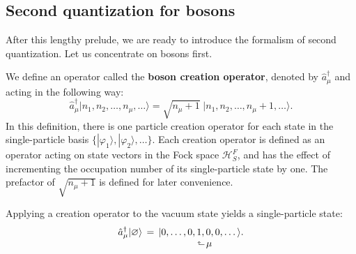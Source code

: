 \documentclass[pra,12pt]{revtex4-2}
\begin{document}
\subsection{Second quantization for bosons}
\label{sec:second_quantized_bosons}

After this lengthy prelude, we are ready to introduce the formalism of
second quantization.  Let us concentrate on bosons first.  

We define an operator called the \textbf{boson creation operator},
denoted by $\hat{a}_\mu^\dagger$ and acting in the following way:
\begin{equation}
  \hat{a}_\mu^\dagger \big|n_1, n_2, \dots, n_\mu, \dots\big\rangle = \sqrt{n_\mu+1} \; \big|n_1, n_2, \dots, n_\mu + 1, \dots\big\rangle.
  \label{amu}
\end{equation}
In this definition, there is one particle creation operator for each
state in the single-particle basis
$\{|\varphi_1\rangle,|\varphi_2\rangle,\dots\}$.  Each creation operator is
defined as an operator acting on state vectors in the Fock space
$\mathscr{H}^F_S$, and has the effect of incrementing the occupation
number of its single-particle state by one.  The prefactor of
$\sqrt{n_\mu+1}$ is defined for later convenience.

Applying a creation operator to the vacuum state yields a
single-particle state:
\begin{align}
  \begin{aligned}\hat{a}_\mu^\dagger |\varnothing\rangle \, &= \, |0,\dots,0, 1, 0, 0, \dots\rangle. \\[-1ex] &\qquad\qquad\quad\;\;\rotatebox[origin=c]{90}{$\Rsh$}\,\mu
  \end{aligned}
\end{align}
\end{document}
